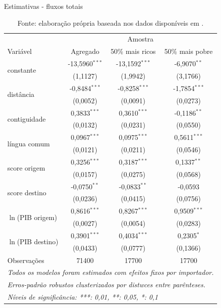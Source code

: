 \documentclass[12pt,
               openright,
               oneside,
               a4paper,
							 section=TITLE,     %
               subsection=Title,  %
               english,brazil]{article}
\begin{document}
\begin{table}[H]
\centering
\caption{Estimativas - fluxos totais}
\label{tab:resultados_totais}
\begin{tabular}{@{}lccc@{}}
 & \multicolumn{3}{c}{Amostra} \\ \cmidrule(l){2-4} 
Variável & Agregado & 50\% mais ricos & 50\% mais pobre \\ \midrule
\multirow{2}{*}{constante} & -13,5960$^{***}$ & -13,1592$^{***}$ & -6,9070$^{**}$ \\
 & (1,1127) & (1,9942) & (3,1766) \\
\multirow{2}{*}{distância} & -0,8484$^{***}$ & -0,8258$^{***}$ & -1,7854$^{***}$ \\
 & (0,0052) & (0,0091) & (0,0273) \\
\multirow{2}{*}{contiguidade} & 0,3833$^{***}$ & 0,3610$^{***}$ & -0,1186$^{**}$ \\
 & (0,0132) & (0,0231) & (0,0550) \\
\multirow{2}{*}{língua comum} & 0,0967$^{***}$ & 0,0975$^{***}$ & 0,5611$^{***}$ \\
 & (0,0121) & (0,0211) & (0,0546) \\
\multirow{2}{*}{score origem} & 0,3256$^{***}$ & 0,3187$^{***}$ & 0,1337$^{**}$ \\
 & (0,0157) & (0,0275) & (0,0568) \\
\multirow{2}{*}{score destino} & -0,0750$^{**}$ & -0,0833$^{**}$ & -0,0593 \\
 & (0,0236) & (0,0415) & (0,0756) \\
\multirow{2}{*}{$\ln$(PIB origem)} & 0,8616$^{***}$ & 0,8267$^{***}$ & 0,9509$^{***}$ \\
 & (0,0027) & (0,0054) & (0,0283) \\
\multirow{2}{*}{$\ln$(PIB destino)} & 0,3901$^{***}$ & 0,4034$^{***}$ & 0,2305$^{*}$ \\
 & (0,0433) & (0,0777) & (0,1366) \\ \midrule
Observações& 71400&17700&17700\\
\bottomrule\bottomrule
\multicolumn{4}{l}{\emph{Todos os modelos foram estimados com efeitos fixos por importador.}}\\
\multicolumn{4}{l}{\emph{Erros-padrão robustos clusterizados por distwces entre parênteses.}}\\
\multicolumn{4}{l}{\emph{Níveis de significância: ***: 0,01, **: 0,05, *: 0,1}}\\
\end{tabular}%
\caption*{\RaggedRight  Fonte: elaboração própria baseada nos dados disponíveis em \cite{Cepii2019, Comtrade2019, WorldBank2019}.} 
\end{table}
\end{document}
